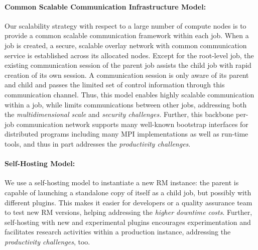 \documentclass[10pt]{article}
\begin{document}
\paragraph{Common Scalable Communication Infrastructure Model:}
Our scalability strategy with respect to a large number of compute nodes 
is to provide a common scalable communication framework within each
job. When a job is created, a secure, scalable overlay network with common
communication service is established across its allocated nodes.
Except for the root-level job, the existing communication session of the
parent job assists the child job with rapid creation of its own session.
A communication session is only aware of its parent and child and passes
the limited set of control information through this communication channel.
Thus, this model enables highly scalable communication within a job, 
while limits communications between other jobs, addressing both the 
{\sl multidimensional scale} and {\sl security challenges.} 
Further, this backbone per-job communication network supports 
many well-known bootstrap interfaces for distributed programs including
many MPI implementations as well as run-time tools, and thus in part
addresses the {\sl productivity challenges}. 


\paragraph{Self-Hosting Model:}
We use a self-hosting model to instantiate a new RM instance: the parent
is capable of launching a standalone copy of itself as a child job, but possibly
with different plugins. 
This makes it easier for developers or a quality assurance team to test new RM versions,
helping addressing the {\sl higher downtime costs}. 
Further, self-hosting with new and experimental plugins 
encourages experimentation and facilitates research activities 
within a production instance, addressing the {\sl productivity challenges}, too.
\end{document}

